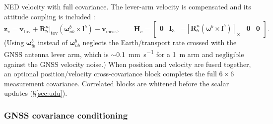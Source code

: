 \documentclass[11pt,a4paper]{article}
\newcommand{\vect}[1]{\bm{#1}}
\newcommand{\mat}[1]{\bm{#1}}
\newcommand{\cross}[1]{\left[#1\right]_{\times}}   %
\newcommand{\nframe}{n}
\newcommand{\bframe}{b}
\newcommand{\Rbn}{\mat{R}_{\bframe}^{\nframe}}
\begin{document}
NED velocity with full covariance. The lever-arm velocity is
compensated and its attitude coupling is included
\cite[eq.~8.74]{wendel2011}:
\begin{equation}
  \vect{z}_v = \vect{v}_{\text{tov}}
  + \Rbn\big|_{\text{tov}}
    \left(\vect{\omega}^\bframe_{\nframe\bframe} \times
    \vect{l}^\bframe\right)
  - \vect{v}_{\text{meas}} ,
  \qquad
  \mat{H}_v =
  \begin{bmatrix}
    \mat{0} & \mat{I}_3 &
    -\cross{\Rbn(\vect{\omega}^\bframe\times\vect{l}^\bframe)} &
    \mat{0} & \mat{0}
  \end{bmatrix}.
\end{equation}
(Using $\vect{\omega}^\bframe_{i\bframe}$ instead of
$\vect{\omega}^\bframe_{\nframe\bframe}$ neglects the Earth/transport rate
crossed with the GNSS antenna lever arm, which is $\sim$\SI{0.1}{\milli\metre\per\second} for
a \SI{1}{\metre} arm and negligible against the GNSS velocity noise.) When
position and velocity are fused together, an optional
position/velocity cross-covariance block completes the full $6\times 6$
measurement covariance. Correlated blocks are whitened before the
scalar updates (\S\ref{sec:udu}).

\subsubsection{GNSS covariance conditioning}
\label{sec:gnss-cond}
\end{document}
